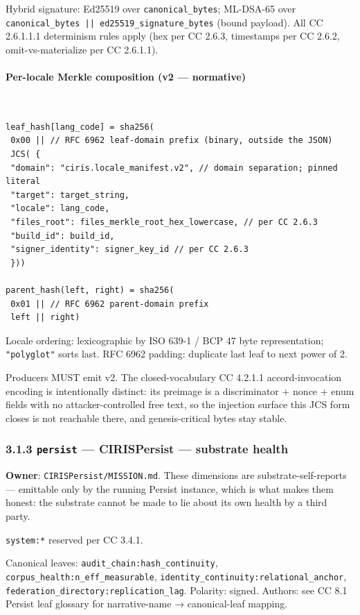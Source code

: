 \documentclass[11pt]{article}
\begin{document}
Hybrid signature: Ed25519 over \texttt{canonical\_bytes}; ML-DSA-65 over \texttt{canonical\_bytes || ed25519\_signature\_bytes} (bound payload). All CC 2.6.1.1.1 determinism rules apply (hex per CC 2.6.3, timestamps per CC 2.6.2, omit-vs-materialize per CC 2.6.1.1).


\paragraph{Per-locale Merkle composition (v2 — normative)}\mbox{}\\


\begin{lstlisting}
leaf_hash[lang_code] = sha256(
 0x00 || // RFC 6962 leaf-domain prefix (binary, outside the JSON)
 JCS( {
 "domain": "ciris.locale_manifest.v2", // domain separation; pinned literal
 "target": target_string,
 "locale": lang_code,
 "files_root": files_merkle_root_hex_lowercase, // per CC 2.6.3
 "build_id": build_id,
 "signer_identity": signer_key_id // per CC 2.6.3
 }))

parent_hash(left, right) = sha256(
 0x01 || // RFC 6962 parent-domain prefix
 left || right)
\end{lstlisting}

Locale ordering: lexicographic by ISO 639-1 / BCP 47 byte representation; \texttt{"polyglot"} sorts last. RFC 6962 padding: duplicate last leaf to next power of 2.


Producers MUST emit v2. The closed-vocabulary CC 4.2.1.1 accord-invocation encoding is intentionally distinct: its preimage is a discriminator + nonce + enum fields with no attacker-controlled free text, so the injection surface this JCS form closes is not reachable there, and genesis-critical bytes stay stable.


\subsubsection*{3.1.3 \texttt{persist} — CIRISPersist — substrate health}


\textbf{Owner}: \texttt{CIRISPersist/MISSION.md}. These dimensions are substrate-self-reports — emittable only by the running Persist instance, which is what makes them honest: the substrate cannot be made to lie about its own health by a third party.


\texttt{system:*} reserved per CC 3.4.1.


Canonical leaves: \texttt{audit\_chain:hash\_continuity}, \texttt{corpus\_health:n\_eff\_measurable}, \texttt{identity\_continuity:relational\_anchor}, \texttt{federation\_directory:replication\_lag}. Polarity: signed. Authors: see CC 8.1 Persist leaf glossary for narrative-name → canonical-leaf mapping.
\end{document}
